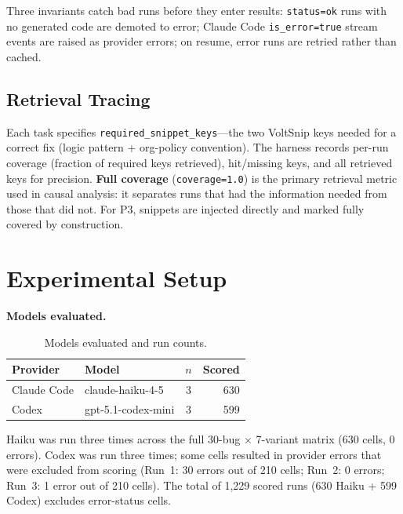 \documentclass[10pt,a4paper,twocolumn]{article}
\begin{document}
Three invariants catch bad runs before they enter results:
\texttt{status=ok} runs with no generated code are demoted to error;
Claude Code \texttt{is\_error=true} stream events are raised as provider
errors; on resume, error runs are retried rather than cached.

\subsection{Retrieval Tracing}
\label{sec:retrieval-tracing}

Each task specifies \texttt{required\_snippet\_keys}---the two VoltSnip
keys needed for a correct fix (logic pattern + org-policy convention).
The harness records per-run coverage (fraction of required keys
retrieved), hit/missing keys, and all retrieved keys for precision.
\textbf{Full coverage} (\texttt{coverage=1.0}) is the primary retrieval
metric used in causal analysis: it separates runs that had the
information needed from those that did not.
For P3, snippets are injected directly and marked fully covered by
construction.

\section{Experimental Setup}
\label{sec:setup}

\textbf{Models evaluated.}

\begin{table}[h!]
\centering
\caption{Models evaluated and run counts.}
\label{tab:models}
\small
\begin{tabular}{@{}llcr@{}}
\toprule
\textbf{Provider} & \textbf{Model} & \textbf{$n$} & \textbf{Scored} \\
\midrule
Claude Code & claude-haiku-4-5   & 3 & 630 \\
Codex       & gpt-5.1-codex-mini & 3 & 599 \\
\bottomrule
\end{tabular}
\end{table}

Haiku was run three times across the full 30-bug $\times$ 7-variant
matrix (630 cells, 0 errors).
Codex was run three times; some cells resulted in provider errors that
were excluded from scoring (Run~1: 30 errors out of 210 cells; Run~2:
0 errors; Run~3: 1 error out of 210 cells).
The total of 1,229 scored runs (630 Haiku + 599 Codex) excludes
error-status cells.
\end{document}
